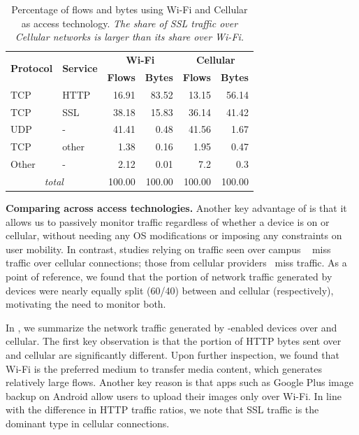 


\begin{table}
\begin{center}
\begin{tabular}{|l|l|r|r|r|r|}
\hline
\multirow{2}{*}{\bf Protocol} & \multirow{2}{*}{\bf Service} & \multicolumn{2}{|c|}{\bf Wi-Fi} & \multicolumn{2}{|c|}{\bf Cellular} \tabularnewline
\cline{3-6}
           &           &  \textbf{Flows}  &  \textbf{Bytes}  &  \textbf{Flows}  &  \textbf{Bytes}  \tabularnewline
\hline
 TCP       &  HTTP     &  16.91  &  83.52  &  13.15  &  56.14  \tabularnewline
\hline
 TCP       &  SSL      &  38.18  &  15.83  &  36.14  &  41.42  \tabularnewline
\hline
UDP       &  -        &  41.41  &   0.48  &  41.56  &   1.67  \tabularnewline
\hline
TCP       &  other    &   1.38 &   0.16  &   1.95  &   0.47  \tabularnewline
\hline
Other     &  -        &   2.12  &  0.01  &   7.2  &   0.3  \tabularnewline
\hline
\multicolumn{2}{|c|}{\emph{total}} & 100.00 & 100.00 & 100.00 & 100.00 \tabularnewline
\hline
\end{tabular}
\end{center}
\caption{Percentage of flows and bytes using Wi-Fi and Cellular as access technology. \emph{The share of SSL traffic over Cellular
    networks is larger than its share over Wi-Fi.}}  
\label{tab:summaryWifiCellularTraffic}
\end{table}


\noindent\textbf{Comparing across access technologies.} Another 
key advantage of \meddle is that it allows us to passively monitor traffic 
regardless of whether a device is on \wifi or cellular, without 
needing any OS modifications or imposing any constraints on 
user mobility. In contrast, studies relying on traffic seen over campus \wifi~\cite{chen:wifi} miss traffic 
over cellular connections; those from cellular providers~\cite{gerber:passivespeed} miss \wifi traffic. 
As a point of reference, we found that the portion of network traffic  
generated by devices were nearly equally split (60/40) between 
\wifi and cellular (respectively), motivating the need to monitor both.

In , we summarize the network 
traffic generated by \meddle-enabled devices over \wifi and cellular.
The first key observation is that the portion of HTTP bytes sent over \wifi and cellular 
are significantly different. Upon further inspection, we found that Wi-Fi is the
preferred medium to transfer media content, which generates relatively large flows. 
Another key reason is that apps such as
Google Plus image backup on Android allow users to upload their
images only over Wi-Fi. In line with the difference in HTTP traffic ratios, we 
note that SSL traffic is the dominant type in cellular connections.

